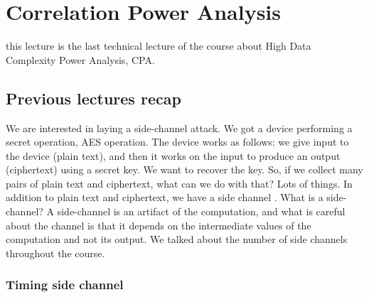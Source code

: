 \chapter{Correlation Power Analysis} \label{c8_fifthcapter}

this lecture is the last technical lecture of the course about High Data
Complexity Power Analysis, CPA.

\section{Previous lectures recap}\label{c8_prev_lectures_recap:sec}

We are interested in laying a side-channel attack. We got a device performing
a secret operation, AES operation. The device works as follows: we give input to
the device (plain text), and then it works on the input to produce an output
(ciphertext) using a secret key. We want to recover the key. So, if we collect
many pairs of plain text and ciphertext, what can we do with that? Lots of
things. In addition to plain text and ciphertext, we have a side channel \cite{SideChannel}. What
is a side-channel? A side-channel is an artifact of the computation, and what is
careful about the channel is that it depends on the intermediate values of the
computation and not its output. We talked about the number of side channels
throughout the course.

\subsection{Timing side channel}\label{c8_prev_lectures_recap_timing_sc:subsec}

